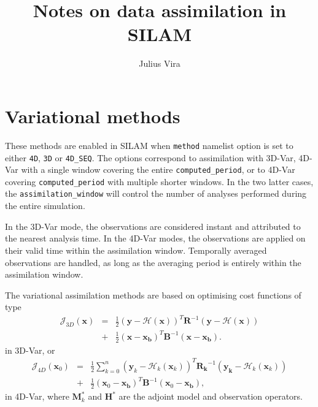 \documentclass[a4paper]{article}
\begin{document}
\title{Notes on data assimilation in SILAM}
\author{Julius Vira}
\maketitle

\section{Variational methods}

These methods are enabled in SILAM when \verb|method| namelist option is set to either
\verb|4D|, \verb|3D| or \verb|4D_SEQ|. The options correspond to assimilation with 3D-Var,
4D-Var with a single window covering the entire \verb|computed_period|, or to 4D-Var
covering \verb|computed_period| with multiple shorter windows. In the two latter cases,
the \verb|assimilation_window| will control the number of analyses performed during the
entire simulation.

In the 3D-Var mode, the observations are considered instant and attributed to the nearest
analysis time. In the 4D-Var modes, the observations are applied on their valid time
within the assimilation window. Temporally averaged observations are handled, as long as
the averaging period is entirely within the assimilation window.

\newcommand{\bx}{\mathbf{x}}
\newcommand{\by}{\mathbf{y}}

\newcommand{\bb}{\mathbf{B}}
\newcommand{\br}{\mathbf{R}}

The variational assimilation methods are based on optimising cost functions of type
\begin{eqnarray}
\label{eq:map}
 \mathcal{J}_{3D}(\bx) &=& \frac{1}{2}(\by - \mathcal{H}(\bx))^T \mathbf{R}^{-1}(\by -
 \mathcal{H}(\bx)) \nonumber \\
&+&
 \frac{1}{2}(\bx - \mathbf{x_b})^T \mathbf{B}^{-1} (\bx - \mathbf{x_b}).
\end{eqnarray}
in 3D-Var, or 
\begin{eqnarray}
\label{eq:cost4d}
\mathcal{J}_{4D}(\bx_0) &=& \frac{1}{2} 
\sum_{k=0}^{n} (\by_k -\mathcal{H}_k(\bx_k))^T \mathbf{\br_k}^{-1}(\mathbf{y_k} -\mathcal{H}_k(\bx_k))
\nonumber \\ &+& \frac{1}{2} (\bx_0 - \mathbf{\bx_b})^T \bb^{-1} (\bx_0 - \mathbf{\bx_b}),
\end{eqnarray}
in 4D-Var, where $\mathbf{M}_k^*$ and $\mathbf{H}^*$ are the adjoint model and observation
operators.
\end{document}
